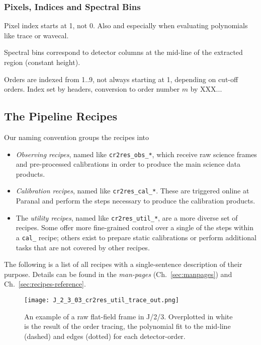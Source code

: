 \subsubsection{Pixels, Indices and Spectral Bins}
Pixel index starts at 1, not 0. Also and especially when evaluating polynomials like trace or wavecal.

Spectral bins correspond to detector columns at the mid-line of the extracted
region (constant height).

Orders are indexed from 1..9, not always starting at 1, depending on cut-off
orders. Index set by headers, conversion to order number $m$ by XXX...

\subsection{The Pipeline Recipes}
\label{sec:recipes-quick}

Our naming convention groups the recipes into
\begin{itemize}
    \item \textit{Observing recipes}, named like \texttt{cr2res\_obs\_*}, which
    receive raw science frames and pre-processed calibrations in order to
    produce the main science data products.
    \item \textit{Calibration recipes}, named like \texttt{cr2res\_cal\_*}. These are triggered online at Paranal and perform the steps necessary to produce the calibration products.
    \item The \textit{utility recipes}, named like \texttt{cr2res\_util\_*}, are a more diverse set of recipes. Some offer more fine-grained control over a single of the steps within a \texttt{cal\_} recipe; others exist to prepare static calibrations or perform additional tasks that are not covered by other recipes.
\end{itemize}

The following is a list of all recipes with a single-sentence description of their purpose. Details can be found in the \emph{man-pages} (Ch.~\ref{sec:manpages}) and Ch.~\ref{sec:recipes-reference}.

\begin{figure}[!tb]
  \begin{center}
    \texttt{[image: J\_2\_3\_03\_cr2res\_util\_trace\_out.png]}
  \end{center}
  \caption{
    \label{fig:flat_trace}
    An example of a raw flat-field frame in J/2/3. Overplotted in white is 
    the result of the order tracing, the polynomial fit to the mid-line
    (dashed) and edges (dotted) for each detector-order.
    }
\end{figure}


